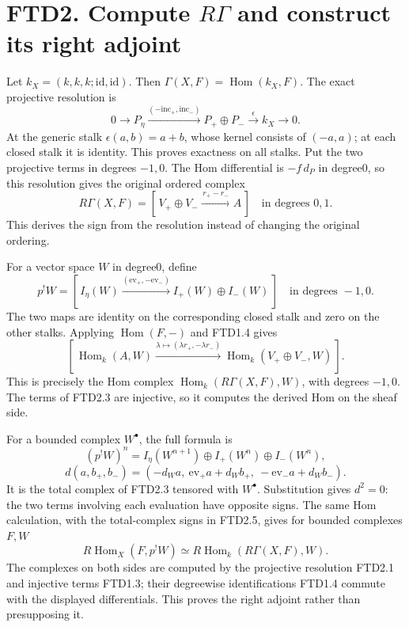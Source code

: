 \section{\texorpdfstring{FTD2. Compute \(R\Gamma\) and construct its
right
adjoint}{FTD2. Compute R\textbackslash Gamma and construct its right adjoint}}\label{ftd2.-compute-rgamma-and-construct-its-right-adjoint}

Let \(k_X=(k,k,k;\mathrm{id},\mathrm{id})\). Then
\(\Gamma(X,F)=\operatorname{Hom}(k_X,F)\). The exact projective
resolution is \[
0\to P_\eta
\xrightarrow{(-\mathrm{inc}_+,\mathrm{inc}_-)}
P_+\oplus P_-
\xrightarrow{\epsilon}k_X\to0.
\tag{FTD2.1}
\] At the generic stalk \(\epsilon(a,b)=a+b\), whose kernel consists of
\((-a,a)\); at each closed stalk it is identity. This proves exactness
on all stalks. Put the two projective terms in degrees \(-1,0\). The Hom
differential is \(-f\,d_P\) in degree0, so this resolution gives the
original ordered complex \[
R\Gamma(X,F)=
[\,V_+\oplus V_-\xrightarrow{\,r_+-r_-\,}A\,]
\quad\text{in degrees }0,1.
\tag{FTD2.2}
\] This derives the sign from the resolution instead of changing the
original ordering.

For a vector space \(W\) in degree0, define \[
\boxed{
p^!W=
[\,I_\eta(W)\xrightarrow{(\mathrm{ev}_+,-\mathrm{ev}_-)}
I_+(W)\oplus I_-(W)\,]
\quad\text{in degrees }-1,0.}
\tag{FTD2.3}
\] The two maps are identity on the corresponding closed stalk and zero
on the other stalks. Applying \(\operatorname{Hom}(F,-)\) and FTD1.4
gives \[
[\,\operatorname{Hom}_k(A,W)
\xrightarrow{\lambda\mapsto(\lambda r_+,-\lambda r_-)}
\operatorname{Hom}_k(V_+\oplus V_-,W)\,].
\tag{FTD2.4}
\] This is precisely the Hom complex
\(\operatorname{Hom}_k(R\Gamma(X,F),W)\), with degrees \(-1,0\). The
terms of FTD2.3 are injective, so it computes the derived Hom on the
sheaf side.

For a bounded complex \(W^\bullet\), the full formula is \[
(p^!W)^n=
I_\eta(W^{n+1})\oplus I_+(W^n)\oplus I_-(W^n),
\] \[
d(a,b_+,b_-)=
(-d_Wa,\ \mathrm{ev}_+a+d_Wb_+,\ -\mathrm{ev}_-a+d_Wb_-).
\tag{FTD2.5}
\] It is the total complex of FTD2.3 tensored with \(W^\bullet\).
Substitution gives \(d^2=0\): the two terms involving each evaluation
have opposite signs. The same Hom calculation, with the total-complex
signs in FTD2.5, gives for bounded complexes \(F,W\) \[
\boxed{
R\operatorname{Hom}_X(F,p^!W)
\simeq R\operatorname{Hom}_k(R\Gamma(X,F),W).}
\tag{FTD2.6}
\] The complexes on both sides are computed by the projective resolution
FTD2.1 and injective terms FTD1.3; their degreewise identifications
FTD1.4 commute with the displayed differentials. This proves the right
adjoint rather than presupposing it.

